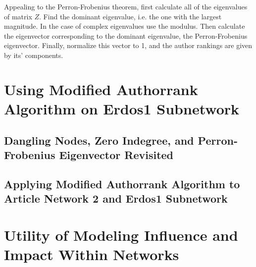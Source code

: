 \documentclass[17pt]{extarticle}
\begin{document}
    
    Appealing to the Perron-Frobenius theorem, first calculate all of the eigenvalues of matrix $Z$. Find the dominant eigenvalue, i.e. the one with the largest magnitude. In the case of complex eigenvalues use the modulus. Then calculate the eigenvector corresponding to the dominant eigenvalue, the Perron-Frobenius eigenvector. Finally, normalize this vector to 1, and the author rankings are given by its' components.
    
  

\section{Using Modified Authorrank Algorithm on Erdos1 Subnetwork}

\subsection{Dangling Nodes, Zero Indegree, and Perron-Frobenius Eigenvector Revisited}

\subsection{Applying Modified Authorrank Algorithm to Article Network 2 and Erdos1 Subnetwork}%

\section{Utility of Modeling Influence and Impact Within Networks}
\end{document}
